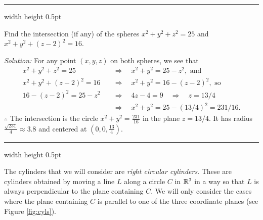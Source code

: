 \smallskip
\hrule width \textwidth height 0.5pt
\begin{exmp}\label{exmp:spheresphere}
 Find the intersection (if any) of the spheres $x^2 + y^2 + z^2 = 25$ and $x^2 + y^2 + (z - 2)^2 = 16$.
 \smallskip
 \par\noindent\emph{Solution:} For any point $(x,y,z)$ on both spheres, we see that
 \begin{align*}
  x^2 + y^2 + z^2 = 25 \quad &\Rightarrow \quad x^2 + y^2 = 25 -  z^2, \text{~and}\\
  x^2 + y^2 + (z - 2)^2 = 16 \quad &\Rightarrow \quad x^2 + y^2 = 16 - (z - 2)^2, \text{~so}\\
  16 - (z - 2)^2 = 25 -  z^2 \quad &\Rightarrow \quad  4z - 4 = 9 \quad
  \Rightarrow \quad z = 13/4\\
  &\Rightarrow \quad  x^2 + y^2 = 25 -  (13/4)^2 = 231/16.
 \end{align*}
 $\therefore$ 
 The intersection is the circle $x^2 + y^2 = \frac{231}{16}$ in the plane $z=13/4$. It has radius $\frac{\sqrt{231}}{4} \approx 3.8$ and
 centered at $(0,0,\frac{13}{4})$.
\end{exmp}
\hrule width \textwidth height 0.5pt
\smallskip

The cylinders that we will consider are \emph{right circular cylinders}. These are
cylinders obtained by moving a line $L$ along a circle $C$ in
$\mathbb{R}^{3}$ in a way so that $L$ is always perpendicular to the plane containing $C$. We will only
consider the cases where the plane containing $C$ is parallel to one of the three coordinate
planes (see Figure \ref{fig:cyls}).

